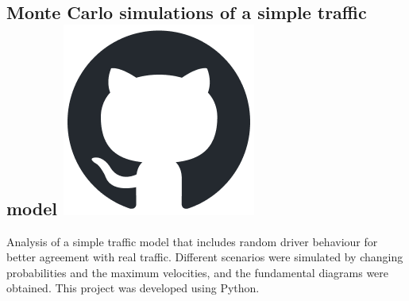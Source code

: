 \subsection{Monte Carlo simulations of a simple traffic model
\hspace{0.1 cm} \href{https://github.com/juanjogervasio/Monte-Carlo-traffic-simulation}{\includegraphics[scale=0.2]{github-mark.png}}
}
Analysis of a simple traffic model that includes random driver behaviour for better agreement with real traffic. Different scenarios were simulated by changing probabilities and the maximum velocities, and the fundamental diagrams were obtained. This project was developed using Python.

